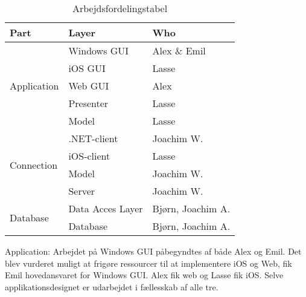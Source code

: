 \begin{table}[]
\centering
\begin{tabular}{|l|l|l|}
\hline
Part                         & Layer            & Who               \\ \hline
\multirow{5}{*}{Application} & Windows GUI      & Alex \& Emil      \\ \cline{2-3} 
                             & iOS GUI          & Lasse             \\ \cline{2-3} 
                             & Web GUI          & Alex              \\ \cline{2-3} 
                             & Presenter        & Lasse             \\ \cline{2-3} 
                             & Model            & Lasse             \\ \hline
\multirow{4}{*}{Connection}  & .NET-client      & Joachim W.        \\ \cline{2-3} 
                             & iOS-client       & Lasse             \\ \cline{2-3} 
                             & Model            & Joachim W.        \\ \cline{2-3} 
                             & Server           & Joachim W.        \\ \hline
\multirow{2}{*}{Database}    & Data Acces Layer & Bjørn, Joachim A. \\ \cline{2-3} 
                             & Database         & Bjørn, Joachim A. \\ \hline
\end{tabular}
\caption{Arbejdsfordelingstabel}
\label{table:arbejdsfordelingstabel}
\end{table}

Application: Arbejdet på Windows GUI påbegyndtes af både Alex og Emil. Det blev vurderet muligt at frigøre ressourcer til at implementere iOS og Web, fik Emil hovedansvaret for Windows GUI. Alex fik web og Lasse fik iOS. Selve applikationsdesignet er udarbejdet i fællesskab af alle tre.